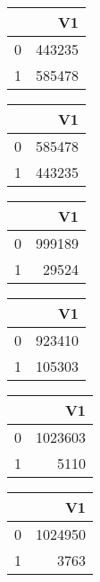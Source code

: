 \bigskip\bigskip
\centering
\begin{tabular}{rr}
  \hline
 & V1 \\ 
  \hline
0 & 443235 \\ 
  1 & 585478 \\ 
   \hline
\end{tabular}

\bigskip\bigskip
\centering
\begin{tabular}{rr}
  \hline
 & V1 \\ 
  \hline
0 & 585478 \\ 
  1 & 443235 \\ 
   \hline
\end{tabular}

\bigskip\bigskip
\centering
\begin{tabular}{rr}
  \hline
 & V1 \\ 
  \hline
0 & 999189 \\ 
  1 & 29524 \\ 
   \hline
\end{tabular}

\bigskip\bigskip
\centering
\begin{tabular}{rr}
  \hline
 & V1 \\ 
  \hline
0 & 923410 \\ 
  1 & 105303 \\ 
   \hline
\end{tabular}

\bigskip\bigskip
\centering
\begin{tabular}{rr}
  \hline
 & V1 \\ 
  \hline
0 & 1023603 \\ 
  1 & 5110 \\ 
   \hline
\end{tabular}

\bigskip\bigskip
\centering
\begin{tabular}{rr}
  \hline
 & V1 \\ 
  \hline
0 & 1024950 \\ 
  1 & 3763 \\ 
   \hline
\end{tabular}

